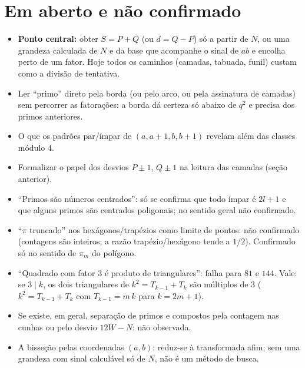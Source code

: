 \documentclass[11pt,a4paper]{article}
\begin{document}
\section{Em aberto e não confirmado}\label{sec:aberto}
\begin{itemize}[leftmargin=1.4em]
  \item \textbf{Ponto central:} obter $S=P+Q$ (ou $d=Q-P$) só a partir de $N$, ou uma grandeza calculada de $N$ e da base que acompanhe o sinal de $ab$ e encolha perto de um fator. Hoje todos os caminhos (camadas, tabuada, funil) custam como a divisão de tentativa.
  \item Ler ``primo'' direto pela borda (ou pelo arco, ou pela assinatura de camadas) sem percorrer as fatorações: a borda dá certeza só abaixo de $q^2$ e precisa dos primos anteriores.
  \item O que os padrões par/ímpar de $(a,a+1,b,b+1)$ revelam além das classes módulo $4$.
  \item Formalizar o papel dos desvios $P\pm1$, $Q\pm1$ na leitura das camadas (seção anterior).
  \item ``Primos são números centrados'': só se confirma que todo ímpar é $2l+1$ e que alguns primos são centrados poligonais; no sentido geral não confirmado.
  \item ``$\pi$ truncado'' nos hexágonos/trapézios como limite de pontos: não confirmado (contagens são inteiros; a razão trapézio/hexágono tende a $1/2$). Confirmado só no sentido de $\pi_m$ do polígono.
  \item ``Quadrado com fator $3$ é produto de triangulares'': falha para $81$ e $144$. Vale: se $3\mid k$, os dois triangulares de $k^2=T_{k-1}+T_k$ são múltiplos de $3$ ($k^2=T_{k-1}+T_k$ com $T_{k-1}=m\,k$ para $k=2m+1$).
  \item Se existe, em geral, separação de primos e compostos pela contagem nas cunhas ou pelo desvio $12W-N$: não observada.
  \item A bisseção pelas coordenadas $(a,b)$: reduz-se à transformada afim; sem uma grandeza com sinal calculável só de $N$, não é um método de busca.
\end{itemize}
\end{document}
